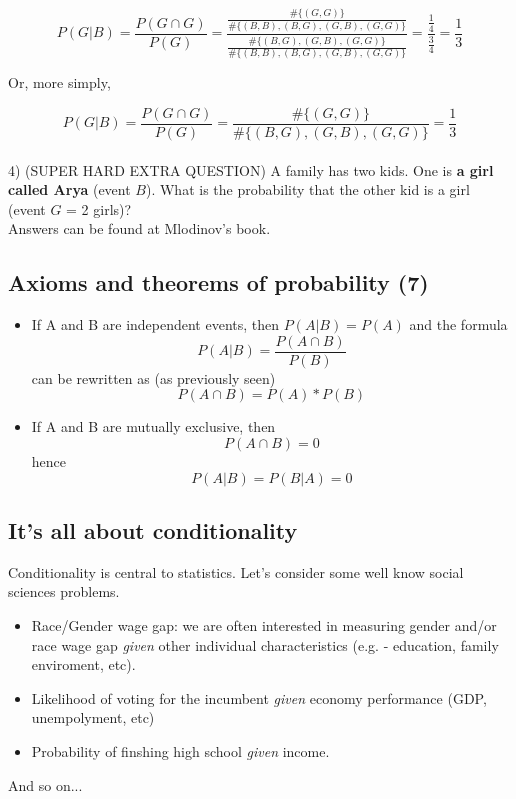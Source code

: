 \documentclass[11pt]{article}
\begin{document}
	\[P(G|B) = \frac{P(G\cap G)}{P(G)} = \frac{\frac{\#\{(G,G)\}}{\#\{(B,B), (B,G), (G,B), (G,G)\}}}
							{\frac{\#\{(B,G), (G,B), (G,G)\}}{\#\{(B,B), (B,G), (G,B), (G,G)\}}} = 
							\frac{\frac{1}{4}}{\frac{3}{4}} = \frac{1}{3} \]

	Or, more simply, 
	
	\[P(G|B) = \frac{P(G\cap G)}{P(G)} = \frac{\#\{(G,G)\}}{\#\{(B,G), (G,B), (G,G)\}} = \frac{1}{3}\]\\

	4) (SUPER HARD EXTRA QUESTION) A family has two kids. One is \textbf{a girl called Arya} (event $B$). What is the probability that the other kid is a girl (event $G$ = 2 girls)?\\

	Answers can be found at Mlodinov's book.

	\subsection*{Axioms and theorems of probability (7)}
	\begin{itemize}
		\item If A and B are independent events, then $P(A|B) = P(A)$ and the formula
	\[P(A|B) = \frac{P(A\cap B)}{P(B)}\]
	can be rewritten as (as previously seen)
	\[P(A\cap B) = P(A)*P(B)\]
			\item If A and B are mutually exclusive, then
		\[P(A\cap B) = 0\]
			hence
		 \[P(A|B) = P(B|A) = 0\] 
	\end{itemize}


	\subsection*{It's all about conditionality}

 	Conditionality is central to statistics. Let's consider some well know social sciences problems.

	\begin{itemize}
		\item	Race/Gender wage gap: we are often interested in measuring gender and/or race wage gap \emph{given} other individual characteristics (e.g. - education, family enviroment, etc).
		\item Likelihood of voting for the incumbent \emph{given} economy performance (GDP, unempolyment, etc)
		\item Probability of finshing high school \emph{given} income.
		\end{itemize}
		 And so on...
\end{document}
